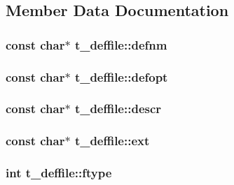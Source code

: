 \subsection{\-Member \-Data \-Documentation}
\hypertarget{structt__deffile_a55c5f5d32b6c2ca8e8314aea835cb6f7}{
\subsubsection[{defnm}]{\setlength{\rightskip}{0pt plus 5cm}const char$\ast$ {\bf t\-\_\-deffile\-::defnm}}}\label{structt__deffile_a55c5f5d32b6c2ca8e8314aea835cb6f7}
\hypertarget{structt__deffile_a427a5bfd1aeacf5491e2ce2109d35734}{
\subsubsection[{defopt}]{\setlength{\rightskip}{0pt plus 5cm}const char$\ast$ {\bf t\-\_\-deffile\-::defopt}}}\label{structt__deffile_a427a5bfd1aeacf5491e2ce2109d35734}
\hypertarget{structt__deffile_a56b8ce266b070da6607875d7d4de5e2d}{
\subsubsection[{descr}]{\setlength{\rightskip}{0pt plus 5cm}const char$\ast$ {\bf t\-\_\-deffile\-::descr}}}\label{structt__deffile_a56b8ce266b070da6607875d7d4de5e2d}
\hypertarget{structt__deffile_a946e2d8e109ea7c08d6d87f2823d6bc9}{
\subsubsection[{ext}]{\setlength{\rightskip}{0pt plus 5cm}const char$\ast$ {\bf t\-\_\-deffile\-::ext}}}\label{structt__deffile_a946e2d8e109ea7c08d6d87f2823d6bc9}
\hypertarget{structt__deffile_a205b9fa1b7a616150530111af0b3b119}{
\subsubsection[{ftype}]{\setlength{\rightskip}{0pt plus 5cm}int {\bf t\-\_\-deffile\-::ftype}}}\label{structt__deffile_a205b9fa1b7a616150530111af0b3b119}
